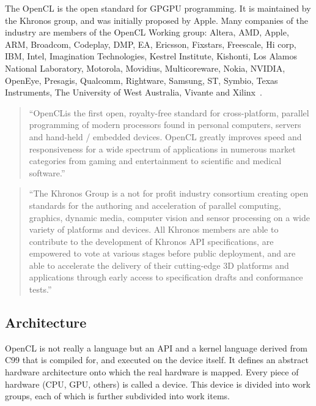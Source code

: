 The \gls{OpenCL} is the open standard for \gls{GPGPU} programming. It is maintained by the Khronos group, and was initially proposed by Apple. Many companies of the industry are members of the \gls{OpenCL} Working group: Altera, AMD, Apple, ARM, Broadcom, Codeplay, DMP, EA, Ericsson, Fixstars, Freescale, Hi corp, IBM, Intel, Imagination Technologies, Kestrel Institute, Kishonti, Los Alamos National Laboratory, Motorola, Movidius, Multicoreware, Nokia, NVIDIA, OpenEye, Presagis, Qualcomm, Rightware, Samsung, ST, Symbio, Texas Instruments, The University of West Australia, Vivante and Xilinx~\cite{opencl}.
\begin{quotation}
``OpenCL\texttrademark is the first open, royalty-free standard for cross-platform, parallel programming of modern processors found in personal computers, servers and hand-held / embedded devices. \gls{OpenCL} greatly improves speed and responsiveness for a wide spectrum of applications in numerous market categories from gaming and entertainment to scientific and medical software.''~\cite{opencl}
\end{quotation}
\begin{quotation}
``The Khronos Group is a not for profit industry consortium creating open standards for the authoring and acceleration of parallel computing, graphics, dynamic media, computer vision and sensor processing on a wide variety of platforms and devices. All Khronos members are able to contribute to the development of Khronos \gls{API} specifications, are empowered to vote at various stages before public deployment, and are able to accelerate the delivery of their cutting-edge 3D platforms and applications through early access to specification drafts and conformance tests.''~\cite{khronos}
\end{quotation}

\subsection{Architecture}

\gls{OpenCL} is not really a language but an \gls{API} and a kernel language derived from C99 that is compiled for, and executed on the device itself. It defines an abstract hardware architecture onto which the real hardware is mapped. Every piece of hardware (\gls{CPU}, \gls{GPU}, others) is called a device. This device is divided into work groups, each of which is further subdivided into work items.

